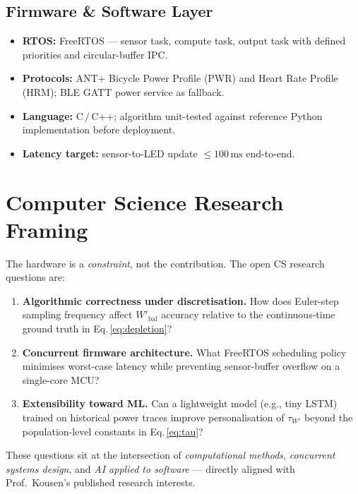\documentclass[11pt, letterpaper]{article}
\begin{document}
\subsection{Firmware \& Software Layer}
\begin{itemize}
  \item \textbf{RTOS:} FreeRTOS --- sensor task, compute task, output task with
    defined priorities and circular-buffer IPC.
  \item \textbf{Protocols:} ANT+ Bicycle Power Profile (PWR) and Heart Rate Profile
    (HRM); BLE GATT power service as fallback.
  \item \textbf{Language:} C\,/\,C++; algorithm unit-tested against reference
    Python implementation before deployment.
  \item \textbf{Latency target:} sensor-to-LED update $\leq 100\,\mathrm{ms}$
    end-to-end.
\end{itemize}

\section{Computer Science Research Framing}

The hardware is a \emph{constraint}, not the contribution.  The open CS research questions are:

\begin{enumerate}
  \item \textbf{Algorithmic correctness under discretisation.}  How does Euler-step
    sampling frequency affect $W'_{\mathrm{bal}}$ accuracy relative to the
    continuous-time ground truth in Eq.\,\eqref{eq:depletion}?

  \item \textbf{Concurrent firmware architecture.}  What FreeRTOS scheduling policy
    minimises worst-case latency while preventing sensor-buffer overflow on a
    single-core MCU?

  \item \textbf{Extensibility toward ML.}  Can a lightweight model (e.g., tiny LSTM)
    trained on historical power traces improve personalisation of $\tau_{W'}$
    beyond the population-level constants in Eq.\,\eqref{eq:tau}?
\end{enumerate}

These questions sit at the intersection of \textit{computational methods},
\textit{concurrent systems design}, and \textit{AI applied to software} ---
directly aligned with Prof.\ Kousen's published research interests.
\end{document}
